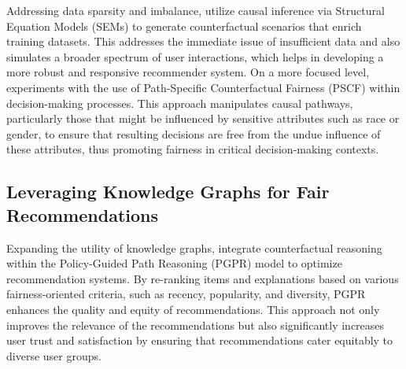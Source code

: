Addressing data sparsity and imbalance, \textcite{yang_top-n_2021} utilize
causal inference via Structural Equation Models (SEMs) to generate
counterfactual scenarios that enrich training datasets. This addresses the
immediate issue of insufficient data and also simulates a broader spectrum of user
interactions, which helps in developing a more robust and responsive recommender
system. On a more focused level, \textcite{chiappa_path-specific_2019} experiments with the
use of Path-Specific Counterfactual Fairness (PSCF) within decision-making processes.
This approach manipulates causal pathways, particularly those that might be influenced
by sensitive attributes such as race or gender, to ensure that resulting
decisions are free from the undue influence of these attributes, thus promoting fairness
in critical decision-making contexts.


\subsection{Leveraging Knowledge Graphs for Fair Recommendations}

Expanding the utility of knowledge graphs, \textcite{balloccu_post_2022}
integrate counterfactual reasoning within the Policy-Guided Path Reasoning (PGPR)
model to optimize recommendation systems. By re-ranking items and explanations based
on various fairness-oriented criteria, such as recency, popularity, and
diversity, PGPR enhances the quality and equity of recommendations. This
approach not only improves the relevance of the recommendations but also
significantly increases user trust and satisfaction by ensuring that
recommendations cater equitably to diverse user groups.